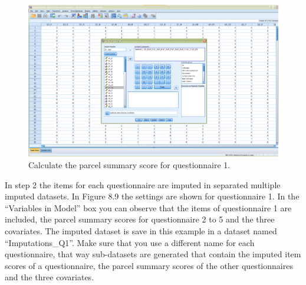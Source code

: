 \documentclass[
]{book}
\begin{document}
\begin{figure}

{\centering \includegraphics[width=0.9\linewidth]{images/fig8.7} 

}

\caption{Calculate the parcel summary score for questionnaire 1.}\label{fig:fig8-7}
\end{figure}

In step 2 the items for each questionnaire are imputed in separated multiple imputed datasets. In Figure 8.9 the settings are shown for questionnaire 1. In the ``Variables in Model'' box you can observe that the items of questionnaire 1 are included, the parcel summary scores for questionnaire 2 to 5 and the three covariates. The imputed dataset is save in this example in a dataset named ``Imputations\_Q1''. Make sure that you use a different name for each questionnaire, that way sub-datasets are generated that contain the imputed item scores of a questionnaire, the parcel summary scores of the other questionnaires and the three covariates.
\end{document}
